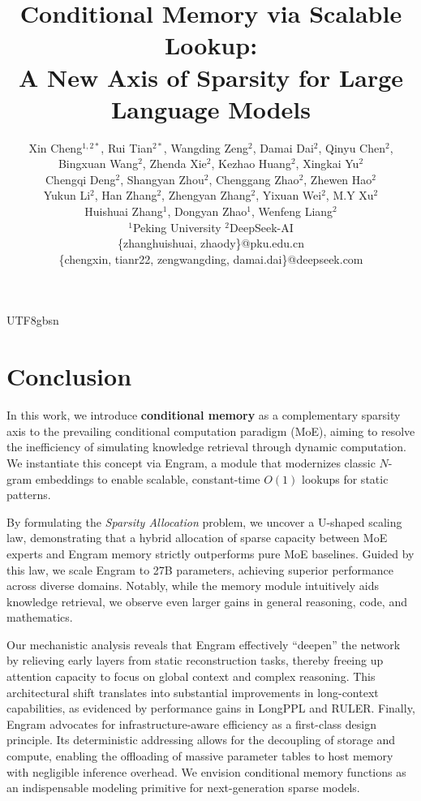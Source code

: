 \documentclass[11pt, a4paper, logo, copyright, nonumbering]{deepseek}
\title{
\centering Conditional Memory via Scalable Lookup: \\ A New Axis of Sparsity for Large Language Models
}
\author[]{
Xin Cheng$^{1,2*}$, Rui Tian$^{2*}$, Wangding Zeng$^{2}$, Damai Dai$^{2}$, Qinyu Chen$^{2}$, 

\vspace{-0.1in}
Bingxuan Wang$^{2}$, Zhenda Xie$^{2}$, Kezhao Huang$^{2}$, Xingkai Yu$^{2}$

\vspace{-0.1in}
Chengqi Deng$^{2}$, Shangyan Zhou$^{2}$, Chenggang Zhao$^{2}$, Zhewen Hao$^{2}$

\vspace{-0.1in}
Yukun Li$^{2}$, Han Zhang$^{2}$, Zhengyan Zhang$^{2}$, Yixuan Wei$^{2}$, M.Y Xu$^{2}$

\vspace{-0.1in}
Huishuai Zhang$^{1}$, Dongyan Zhao$^{1}$, Wenfeng Liang$^{2}$ \\
\vspace{-0.1in}
\small
$^1$Peking University  \quad $^2$DeepSeek-AI \\
\small
\{zhanghuishuai, zhaody\}@pku.edu.cn \\
\small 
\{chengxin, tianr22, zengwangding, damai.dai\}@deepseek.com



\vspace{-0.2in}
}
\begin{document}
\begin{CJK*}{UTF8}{gbsn}

\maketitle
\renewcommand{\thefootnote}{*}
\renewcommand{\thefootnote}{\arabic{footnote}}









\section{Conclusion}

In this work, we introduce \textbf{conditional memory} as a complementary sparsity axis to the prevailing conditional computation paradigm (MoE), aiming to resolve the inefficiency of simulating knowledge retrieval through dynamic computation. We instantiate this concept via Engram, a module that modernizes classic $N$-gram embeddings to enable scalable, constant-time $O(1)$ lookups for static patterns.

By formulating the \textit{Sparsity Allocation} problem, we uncover a U-shaped scaling law, demonstrating that a hybrid allocation of sparse capacity between MoE experts and Engram memory strictly outperforms pure MoE baselines. Guided by this law, we scale Engram to 27B parameters, achieving superior performance across diverse domains. Notably, while the memory module intuitively aids knowledge retrieval, we observe even larger gains in general reasoning, code, and mathematics.

Our mechanistic analysis reveals that Engram effectively ``deepen'' the network by relieving early layers from static reconstruction tasks, thereby freeing up attention capacity to focus on global context and complex reasoning. This architectural shift translates into substantial improvements in long-context capabilities, as evidenced by performance gains in LongPPL and RULER. Finally, Engram advocates for infrastructure-aware efficiency as a first-class design principle. Its deterministic addressing allows for the decoupling of storage and compute, enabling the offloading of massive parameter tables to host memory with negligible inference overhead. We envision conditional memory functions as an indispensable modeling primitive for next-generation sparse models.




\end{CJK*}
\end{document}
